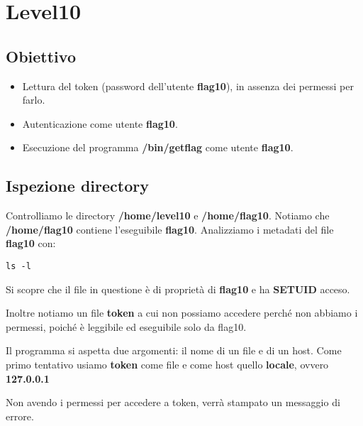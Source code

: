 \section{Level10}
\subsection{Obiettivo}
\begin{itemize}
    \item Lettura del token (password dell’utente \textbf{flag10}), in assenza dei permessi per farlo.
    \item Autenticazione come utente \textbf{flag10}.
    \item Esecuzione del programma \textbf{/bin/getflag} come utente \textbf{flag10}.
\end{itemize}

\subsection{Ispezione directory}
Controlliamo le directory \textbf{/home/level10} e \textbf{/home/flag10}. Notiamo che \textbf{/home/flag10} contiene l’eseguibile \textbf{flag10}.
Analizziamo i metadati del file \textbf{flag10} con: 
\begin{lstlisting}[style=bashstyle]
    ls -l
\end{lstlisting}
Si scopre che il file in questione è di proprietà di \textbf{flag10} e ha \textbf{SETUID} acceso.

Inoltre notiamo un file \textbf{token} a cui non possiamo accedere perché non abbiamo i permessi, poiché è leggibile ed eseguibile solo da flag10.

Il programma si aspetta due argomenti: il nome di un file e di un host. Come primo tentativo usiamo \textbf{token} come file e come host quello \textbf{locale}, ovvero \textbf{127.0.0.1}

Non avendo i permessi per accedere a token, verrà stampato un messaggio di errore.

